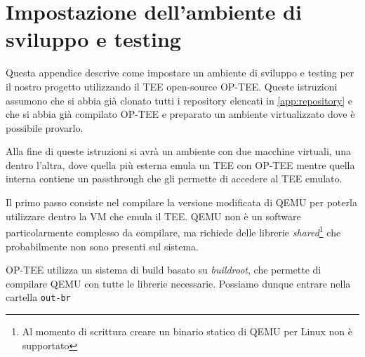 \documentclass[12pt,italian]{report}
\begin{document}
\chapter{Impostazione dell'ambiente di sviluppo e testing}
\label{app:impostazione-ambiente-sviluppo-testing}
Questa appendice descrive come impostare un ambiente di sviluppo e testing
per il nostro progetto utilizzando il TEE open-source OP-TEE.
Queste istruzioni assumono che si abbia già clonato tutti i repository
elencati in \ref{app:repository} e che si abbia già compilato OP-TEE e
preparato un ambiente virtualizzato dove è possibile provarlo.

Alla fine di queste istruzioni si avrà un ambiente con due macchine virtuali,
una dentro l'altra, dove quella più esterna emula un TEE con OP-TEE mentre
quella interna contiene un passthrough che gli permette di accedere al TEE
emulato.

Il primo passo consiste nel compilare la versione modificata di QEMU per
poterla utilizzare dentro la VM che emula il TEE.
QEMU non è un software particolarmente complesso da compilare, ma richiede
delle librerie \textit{shared}\footnote{
    Al momento di scrittura creare un binario statico di QEMU per Linux
    non è supportato
} che probabilmente non sono presenti sul sistema.

OP-TEE utilizza un sistema di build basato su \textit{buildroot}, che
permette di compilare QEMU con tutte le librerie necessarie.
Possiamo dunque entrare nella cartella \texttt{out-br}
\end{document}
